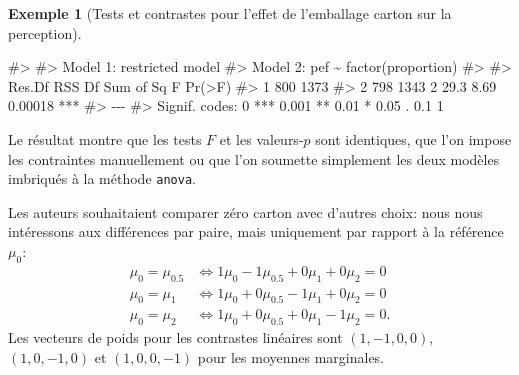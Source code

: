 \documentclass[
  11pt,
  letterpaper,
]{scrbook}
\newenvironment{Shaded}{\begin{snugshade}}{\end{snugshade}}
\newcommand{\CommentTok}[1]{\textcolor[rgb]{0.37,0.37,0.37}{#1}}
\theoremstyle{plain}
\theoremstyle{plain}
\theoremstyle{definition}
\newtheorem{example}{Exemple}[chapter]
\theoremstyle{definition}
\theoremstyle{remark}
\begin{document}
\begin{example}[Tests et contrastes pour l'effet de l'emballage carton
sur la
perception]
\begin{Shaded}
\begin{Highlighting}[]
\CommentTok{\#\textgreater{} }
\CommentTok{\#\textgreater{} Model 1: restricted model}
\CommentTok{\#\textgreater{} Model 2: pef \textasciitilde{} factor(proportion)}
\CommentTok{\#\textgreater{} }
\CommentTok{\#\textgreater{}   Res.Df  RSS Df Sum of Sq    F  Pr(\textgreater{}F)    }
\CommentTok{\#\textgreater{} 1    800 1373                              }
\CommentTok{\#\textgreater{} 2    798 1343  2      29.3 8.69 0.00018 ***}
\CommentTok{\#\textgreater{} {-}{-}{-}}
\CommentTok{\#\textgreater{} Signif. codes:  0 \textquotesingle{}***\textquotesingle{} 0.001 \textquotesingle{}**\textquotesingle{} 0.01 \textquotesingle{}*\textquotesingle{} 0.05 \textquotesingle{}.\textquotesingle{} 0.1 \textquotesingle{} \textquotesingle{} 1}
\end{Highlighting}
\end{Shaded}

Le résultat montre que les tests \(F\) et les valeurs-\(p\) sont
identiques, que l'on impose les contraintes manuellement ou que l'on
soumette simplement les deux modèles imbriqués à la méthode
\texttt{anova}.

Les auteurs souhaitaient comparer zéro carton avec d'autres choix: nous
nous intéressons aux différences par paire, mais uniquement par rapport
à la référence \(\mu_{0}\): \begin{align*}
\mu_0 = \mu_{0.5}  & \iff 1\mu_0 - 1\mu_{0.5} + 0\mu_{1} + 0 \mu_{2} = 0\\
\mu_0 = \mu_{1} & \iff 1\mu_0 + 0\mu_{0.5} -1\mu_{1} + 0 \mu_{2} = 0\\
\mu_0 = \mu_{2} & \iff 1\mu_0 + 0\mu_{0.5} + 0\mu_{1} -1 \mu_{2} = 0.
\end{align*} Les vecteurs de poids pour les contrastes linéaires sont
\((1, -1, 0, 0),\) \((1, 0, -1, 0)\) et \((1, 0, 0, -1)\) pour les
moyennes marginales.


\end{example}
\end{document}
